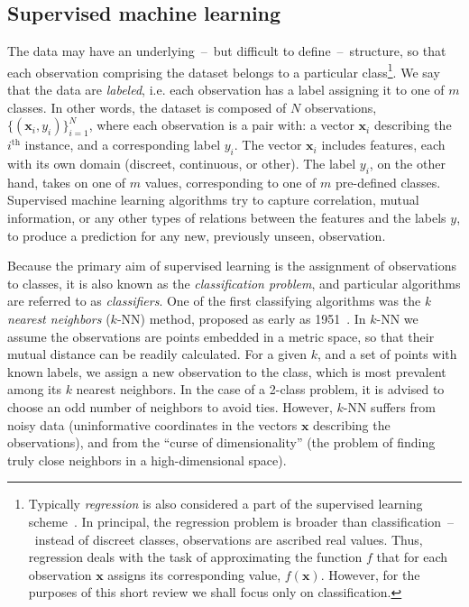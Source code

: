 \documentclass[a4paper,11pt,twoside]{book}%
\begin{document}
\subsection{Supervised machine learning}

The data may have an underlying~--~but difficult to define~--~structure, so that each observation comprising the dataset belongs to a particular class\footnote{
Typically \emph{regression} is also considered a part of the supervised learning scheme~\cite{james2013introduction}.
In principal, the regression problem is broader than classification~--~instead of discreet classes, observations are ascribed real values. 
Thus, regression deals with the task of approximating the function $f$ that for each observation $\mathbf{x}$ assigns its corresponding value, $f(\mathbf{x})$.
However, for the purposes of this short review we shall focus only on classification.
}.
We say that the data are \emph{labeled}, i.e. each observation has a label assigning it to one of $m$ classes.
In other words, the dataset is composed of $N$ observations, $\{ (\mathbf{x}_i, y_i) \}_{i=1}^N$, where each observation is a pair with: a vector $\mathbf{x}_i$ describing the $i^\text{th}$ instance, and a corresponding label $y_i$.
The vector $\mathbf{x}_i$ includes features, each with its own domain (discreet, continuous, or other).
The label $y_i$, on the other hand, takes on one of $m$ values, corresponding to one of $m$ pre-defined classes.
Supervised machine learning algorithms try to capture correlation, mutual information, or any other types of relations between the features and the labels $y$, to produce a prediction for any new, previously unseen, observation.

Because the primary aim of supervised learning is the assignment of observations to classes, it is also known as the \emph{classification problem}, and particular algorithms are referred to as \emph{classifiers}.
One of the first classifying algorithms was the \emph{k nearest neighbors} ($k$-NN) method, proposed as early as 1951~\cite{fix1951discriminatory}.
In $k$-NN we assume the observations are points embedded in a metric space, so that their mutual distance can be readily calculated.
For a given $k$, and a set of points with known labels, we assign a new observation to the class, which is most prevalent among its $k$ nearest neighbors.
In the case of a 2-class problem, it is advised to choose an odd number of neighbors to avoid ties.
However, $k$-NN suffers from noisy data (uninformative coordinates in the vectors $\mathbf{x}$ describing the observations), and from the ``curse of dimensionality'' (the problem of finding truly close neighbors in a high-dimensional space).
\end{document}
